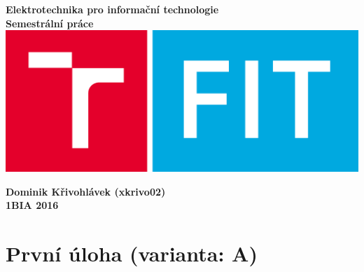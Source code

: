 \documentclass[12pt]{article}
\begin{document}
\begin{titlepage}
\begin{center}
\vspace*{2cm}
\Large{\textbf{Elektrotechnika pro informační technologie}}\\
\textbf{Semestrální práce}\\

\vfill
\includegraphics[scale=0.125]{pics/fit_logo.png}
\vfill

\textbf{Dominik Křivohlávek (xkrivo02)}\\
\textbf{1BIA 2016}\\

\end{center}
\end{titlepage}

\section{První úloha (varianta: A)}
\end{document}
